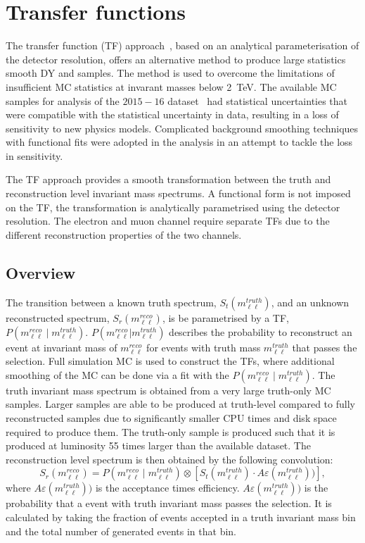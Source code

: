 \section{Transfer functions}\label{sec:datamc:transfer}
The transfer function (TF) approach~\cite{Aad:2019fac}, based on an analytical parameterisation of the detector resolution, offers an alternative method to produce large statistics smooth DY and \ttbar samples. The method is used to overcome the limitations of insufficient MC statistics at invarant masses below \SI{2}{\tera\electronvolt}. The available MC samples for analysis of the $2015-16$ dataset~\cite{EXOT-2016-05} had statistical uncertainties that were compatible with the statistical uncertainty in data, resulting in a loss of sensitivity to new physics models. Complicated background smoothing techniques with functional fits were adopted in the analysis in an attempt to tackle the loss in sensitivity. 

The TF approach provides a smooth transformation between the truth and reconstruction level invariant mass spectrums. A functional form is not imposed on the TF, the transformation is analytically parametrised using the detector resolution. The electron and muon channel require separate TFs due to the different reconstruction properties of the two channels. 

\subsection{Overview}
The transition between a known truth spectrum, $S_t(m_{\ell\ell}^{truth})$, and an unknown reconstructed spectrum, $S_r(m_{\ell\ell}^{reco})$, is be parametrised by a TF, $P(m_{\ell\ell}^{reco} \mid m_{\ell\ell}^{truth})$. $P(m_{\ell\ell}^{reco} | m_{\ell\ell}^{truth})$ describes the probability to reconstruct an event at invariant mass of $m_{\ell\ell}^{reco}$ for events with truth mass $m_{\ell\ell}^{truth}$ that passes the selection. Full simulation MC is used to construct the TFs, where additional smoothing of the MC can be done via a fit with the $P(m_{\ell\ell}^{reco} \mid m_{\ell\ell}^{truth})$. The truth invariant mass spectrum is obtained from a very large truth-only MC samples. Larger samples are able to be produced at truth-level compared to fully reconstructed samples due to significantly smaller CPU times and disk space required to produce them. The truth-only sample is produced such that it is produced at luminosity 55 times larger than the available dataset. The reconstruction level spectrum is then obtained by the following convolution: 
\begin{equation}\label{eq:TF_generalConv}
	S_r(m_{\ell\ell}^{reco}) = P(m_{\ell\ell}^{reco} \mid m_{\ell\ell}^{truth}) \otimes \left[ S_t(m_{\ell\ell}^{truth}) \cdot A\varepsilon(m_{\ell\ell}^{truth})) \right], 
\end{equation}
where $A\varepsilon(m_{\ell\ell}^{truth}))$ is the acceptance times efficiency. $A\varepsilon(m_{\ell\ell}^{truth}))$ is the probability that a event with truth invariant mass passes the selection. It is calculated by taking the fraction of events accepted in a truth invariant mass bin and the total number of generated events in that bin. 

